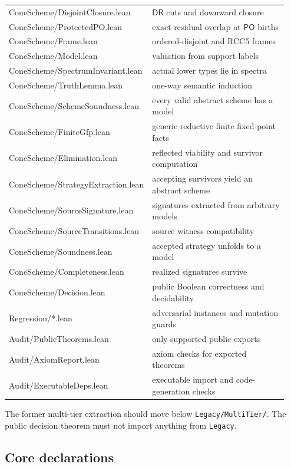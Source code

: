 \documentclass[11pt]{article}
\newcommand{\PO}{\mathsf{PO}}
\newcommand{\DR}{\mathsf{DR}}
\begin{document}
\begin{longtable}{>{\ttfamily\small}p{0.42\linewidth}p{0.52\linewidth}}
ConeScheme/DisjointClosure.lean & $\DR$ cuts and downward closure \\
ConeScheme/ProtectedPO.lean & exact residual overlap at $\PO$ births \\
ConeScheme/Frame.lean & ordered-disjoint and RCC5 frames \\
ConeScheme/Model.lean & valuation from support labels \\
ConeScheme/SpectrumInvariant.lean & actual lower types lie in spectra \\
ConeScheme/TruthLemma.lean & one-way semantic induction \\
ConeScheme/SchemeSoundness.lean & every valid abstract scheme has a model \\
ConeScheme/FiniteGfp.lean & generic reductive finite fixed-point facts \\
ConeScheme/Elimination.lean & reflected viability and survivor computation \\
ConeScheme/StrategyExtraction.lean & accepting survivors yield an abstract scheme \\
ConeScheme/SourceSignature.lean & signatures extracted from arbitrary models \\
ConeScheme/SourceTransitions.lean & source witness compatibility \\
ConeScheme/Soundness.lean & accepted strategy unfolds to a model \\
ConeScheme/Completeness.lean & realized signatures survive \\
ConeScheme/Decision.lean & public Boolean correctness and decidability \\
Regression/*.lean & adversarial instances and mutation guards \\
Audit/PublicTheorems.lean & only supported public exports \\
Audit/AxiomReport.lean & axiom checks for exported theorems \\
Audit/ExecutableDeps.lean & executable import and code-generation checks \\
\bottomrule
\end{longtable}

The former multi-tier extraction should move below \texttt{Legacy/MultiTier/}. The public
decision theorem must not import anything from \texttt{Legacy}.

\subsection{Core declarations}
\end{document}
